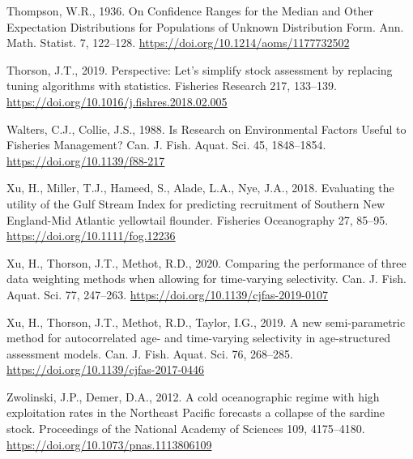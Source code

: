 \documentclass[]{article}
\begin{document}
\leavevmode\hypertarget{ref-thompson1936Confidence}{}%
Thompson, W.R., 1936. On Confidence Ranges for the Median and Other
Expectation Distributions for Populations of Unknown Distribution Form.
Ann. Math. Statist. 7, 122--128.
\url{https://doi.org/10.1214/aoms/1177732502}

\leavevmode\hypertarget{ref-thorson2019Perspective}{}%
Thorson, J.T., 2019. Perspective: Let's simplify stock assessment by
replacing tuning algorithms with statistics. Fisheries Research 217,
133--139. \url{https://doi.org/10.1016/j.fishres.2018.02.005}

\leavevmode\hypertarget{ref-walters1988Research}{}%
Walters, C.J., Collie, J.S., 1988. Is Research on Environmental Factors
Useful to Fisheries Management? Can. J. Fish. Aquat. Sci. 45,
1848--1854. \url{https://doi.org/10.1139/f88-217}

\leavevmode\hypertarget{ref-xu2018Evaluating}{}%
Xu, H., Miller, T.J., Hameed, S., Alade, L.A., Nye, J.A., 2018.
Evaluating the utility of the Gulf Stream Index for predicting
recruitment of Southern New England-Mid Atlantic yellowtail flounder.
Fisheries Oceanography 27, 85--95.
\url{https://doi.org/10.1111/fog.12236}

\leavevmode\hypertarget{ref-xu2020Comparing}{}%
Xu, H., Thorson, J.T., Methot, R.D., 2020. Comparing the performance of
three data weighting methods when allowing for time-varying selectivity.
Can. J. Fish. Aquat. Sci. 77, 247--263.
\url{https://doi.org/10.1139/cjfas-2019-0107}

\leavevmode\hypertarget{ref-xu2019New}{}%
Xu, H., Thorson, J.T., Methot, R.D., Taylor, I.G., 2019. A new
semi-parametric method for autocorrelated age- and time-varying
selectivity in age-structured assessment models. Can. J. Fish. Aquat.
Sci. 76, 268--285. \url{https://doi.org/10.1139/cjfas-2017-0446}

\leavevmode\hypertarget{ref-zwolinski2012Cold}{}%
Zwolinski, J.P., Demer, D.A., 2012. A cold oceanographic regime with
high exploitation rates in the Northeast Pacific forecasts a collapse of
the sardine stock. Proceedings of the National Academy of Sciences 109,
4175--4180. \url{https://doi.org/10.1073/pnas.1113806109}

\pagebreak
\end{document}
